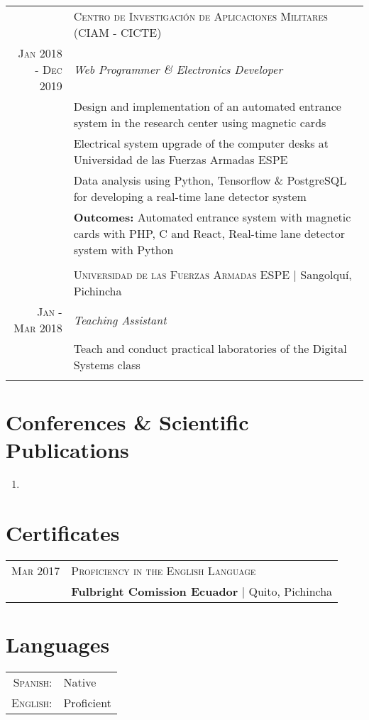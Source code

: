 \documentclass[a4paper,10.9pt]{article}
\begin{document}
\begin{tabular}{r|p{11cm}}
&\textsc{Centro de Investigación de Aplicaciones Militares (CIAM - CICTE)} \\
\textsc{Jan 2018 - Dec 2019}&\emph{Web Programmer \& Electronics Developer}\\&\footnotesize{Design and implementation of an automated entrance system in the research center using magnetic cards}\\&\footnotesize{Electrical system upgrade of the computer desks at Universidad de las Fuerzas Armadas ESPE}\\&\footnotesize{Data analysis using Python, Tensorflow \& PostgreSQL for developing a real-time lane detector system}
&\\
&\footnotesize{\textbf{Outcomes:} Automated entrance system with magnetic cards with PHP, C and React, Real-time lane detector system with Python}\\
\multicolumn{2}{c}{} \\ 
 &\textsc{Universidad de las Fuerzas Armadas ESPE} | Sangolquí, Pichincha \\
 \textsc{Jan - Mar 2018}&\emph{Teaching Assistant}\\&\footnotesize{Teach and conduct practical laboratories of the Digital Systems class}\\
\\
\end{tabular}


\section{Conferences \& Scientific Publications}
\begin{enumerate}
	\item {}
\end{enumerate}

\section{Certificates}
\begin{tabular}{r|l}	
 \textsc{Mar} 2017 &  \textsc{Proficiency in the English Language}\\&
 \textbf{Fulbright Comission Ecuador} | Quito, Pichincha\\

\end{tabular}

\section{Languages}
\begin{tabular}{rl}
 \textsc{Spanish:}&Native\\
\textsc{English:}&Proficient\\
\end{tabular}
\end{document}
